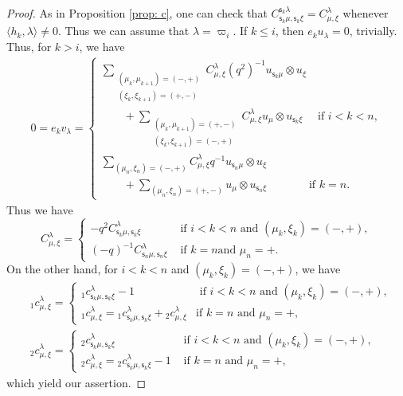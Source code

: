 \documentclass[11pt, leqno]{amsart}
\theoremstyle{definition}
\numberwithin{equation}{section}
\begin{document}
\begin{proof} As in Proposition \ref{prop: c}, one can check that $C_{{\mathsf{s}}_k\mu,{\mathsf{s}}_k\xi}^{{\mathsf{s}}_k\lambda}=C_{\mu,\xi}^{\lambda}$ whenever
$\langle h_k,\lambda \rangle \neq 0$. Thus we can assume that
$\lambda={\varpi}_{i}$. If $k \le i$, then $e_k u_\lambda=0$, trivially.
Thus, for $k > i$, we have
\begin{align*}
0= e_k v_\lambda  = \begin{cases} \sum_{\substack{ (\mu_{k},\mu_{k+1}) =(-,+) \\
(\xi_{k},\xi_{k+1}) =(+,-) }} C_{\mu,\xi}^{\lambda}(q^2)^{-1} u_{{\mathsf{s}}_k \mu}
\otimes u_{\xi} \\
 \qquad + \sum_{\substack{ (\mu_{k},\mu_{k+1}) =(+,-) \\
(\xi_{k},\xi_{k+1}) =(-,+) }}C_{\mu,\xi}^{\lambda}u_{\mu} \otimes
u_{{\mathsf{s}}_k \xi} \quad  \text{ if }  i< k <n, \\
\sum_{ (\mu_{n},\xi_n) =(-,+) } C_{\mu,\xi}^{\lambda}q^{-1}  u_{{\mathsf{s}}_n
\mu} \otimes u_{\xi}\\  \qquad   +\sum_{ (\mu_{n},\xi_n) =(+,-) }
u_{\mu} \otimes u_{{\mathsf{s}}_n \xi} \qquad \quad \ \  \text{ if }  k=n.
\end{cases}
\end{align*}
Thus we have
$$ C_{\mu,\xi}^{\lambda} =
\begin{cases}
-q^2 C_{{\mathsf{s}}_k\mu,{\mathsf{s}}_k\xi}^{\lambda}  & \text{ if } i < k <n \text{ and } (\mu_{k},\xi_{k}) =(-,+),  \\[1ex]
(-q)^{-1} C_{{\mathsf{s}}_n\mu,{\mathsf{s}}_n\xi}^{\lambda}  & \text{ if } k=n \text{
and } \mu_{n}=+. \end{cases}
$$
On the other hand, for $i< k <n$ and $(\mu_{k},\xi_{k}) =(-,+)$, we
have \begin{align*} & {}_1c_{\mu,\xi}^{\lambda} = \begin{cases}
{}_1c_{{\mathsf{s}}_k\mu,{\mathsf{s}}_k\xi}^{\lambda}-1 & \text{ if } i < k <n \text{ and } (\mu_{k},\xi_{k}) =(-,+),  \\
{}_1c_{\mu,\xi}^{\lambda} =
{}_1c_{{\mathsf{s}}_k\mu,{\mathsf{s}}_k\xi}^{\lambda}+{}_2c_{\mu,\xi}^{\lambda} & \text{
if } k=n \text{ and } \mu_{n}=+, \end{cases} \\
& {}_2c_{\mu,\xi}^{\lambda}=
\begin{cases}
{}_2c_{{\mathsf{s}}_k\mu,{\mathsf{s}}_k\xi}^{\lambda}  & \text{ if } i < k <n \text{ and } (\mu_{k},\xi_{k}) =(-,+),  \\
  {}_2c_{\mu,\xi}^{\lambda}={}_2c_{{\mathsf{s}}_k\mu,{\mathsf{s}}_k\xi}^{\lambda}-1 &
\text{ if } k=n \text{ and } \mu_{n}=+,\end{cases}\end{align*} which
yield our assertion.
\end{proof}
\end{document}
